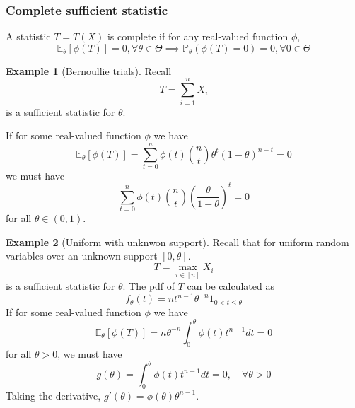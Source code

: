 \documentclass[11pt, oneside]{book}
\theoremstyle{definition}
\newtheorem{exmp}{Example}[section]
\begin{document}
\subsubsection{Complete sufficient statistic}

A statistic $T=T(X)$ is complete if for any real-valued function $\phi$,
\[
    \mathbb{E}_\theta [\phi(T)] = 0, \forall \theta \in \Theta \implies \mathbb{P}_\theta(\phi(T)=0) = 0, \forall 0 \in \Theta   
\]


\begin{exmp}
    [Bernoullie trials]
    Recall
    \[
        T = \sum_{i=1}^{n} X_i
    \]
    is a sufficient statistic for $\theta$.

    If for some real-valued function $\phi$ we have
    \[
        \mathbb{E}_\theta[\phi(T)] = \sum_{t=0}^{n} \phi(t) {n \choose t} \theta^t (1-\theta)^{n-t} = 0   
    \]
    we must have
    \[
        \sum_{t=0}^{n} \phi(t) {n \choose t} \left( \frac{\theta}{1-\theta} \right)^t = 0
    \]
    for all $\theta \in (0, 1)$.

\end{exmp}

\begin{exmp} 
    [Uniform with unknwon support]
    Recall that for uniform random variables over an unknown support $[0, \theta]$.
    \[
        T = \max_{i \in [n]} X_i   
    \]
    is a sufficient statistic for $\theta$.
    The pdf of $T$ can be calculated as
    \[
        f_\theta(t) = n t^{n-1} \theta^{-n} 1_{0 < t \leq \theta}
    \]
    If for some real-valued function $\phi$ we have
    \[
        \mathbb{E}_\theta[\phi(T)] = n \theta^{-n} \int_0^\theta \phi(t) t^{n-1} dt = 0
    \]
    for all $\theta > 0$, we must have
    \[
        g(\theta) = \int_0^\theta \phi(t) t^{n-1} dt = 0, \quad \forall \theta > 0
    \]
    Taking the derivative, $g'(\theta)=\phi(\theta)\theta^{n-1}$.

\end{exmp}
\end{document}
